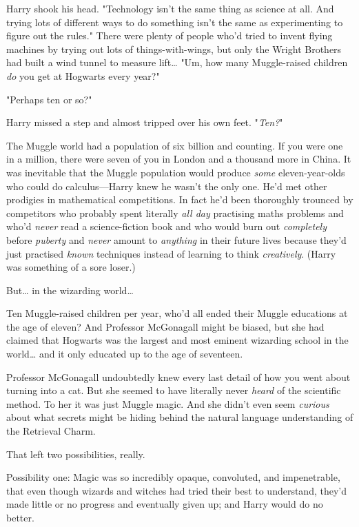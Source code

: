 Harry shook his head. "Technology isn't the same thing as science at all. And
trying lots of different ways to do something isn't the same as experimenting
to figure out the rules." There were plenty of people who'd tried to invent
flying machines by trying out lots of things-with-wings, but only the Wright
Brothers had built a wind tunnel to measure lift{\ldots} "Um, how many
Muggle-raised children \emph{do} you get at Hogwarts every year?"

"Perhaps ten or so?"

Harry missed a step and almost tripped over his own feet. "\emph{Ten?}"

The Muggle world had a population of six billion and counting. If you were one
in a million, there were seven of you in London and a thousand more in China.
It was inevitable that the Muggle population would produce \emph{some}
eleven-year-olds who could do calculus---Harry knew he wasn't the only one.
He'd met other prodigies in mathematical competitions. In fact he'd been
thoroughly trounced by competitors who probably spent literally \emph{all day}
practising maths problems and who'd \emph{never} read a science-fiction book
and who would burn out \emph{completely} before \emph{puberty} and \emph{never}
amount to \emph{anything} in their future lives because they'd just practised
\emph{known} techniques instead of learning to think \emph{creatively}. (Harry
was something of a sore loser.)

But{\ldots} in the wizarding world{\ldots}

Ten Muggle-raised children per year, who'd all ended their Muggle educations at
the age of eleven? And Professor McGonagall might be biased, but she had
claimed that Hogwarts was the largest and most eminent wizarding school in the
world{\ldots} and it only educated up to the age of seventeen.

Professor McGonagall undoubtedly knew every last detail of how you went about
turning into a cat. But she seemed to have literally never \emph{heard} of the
scientific method. To her it was just Muggle magic. And she didn't even seem
\emph{curious} about what secrets might be hiding behind the natural language
understanding of the Retrieval Charm.

That left two possibilities, really.

Possibility one: Magic was so incredibly opaque, convoluted, and impenetrable,
that even though wizards and witches had tried their best to understand, they'd
made little or no progress and eventually given up; and Harry would do no
better.


